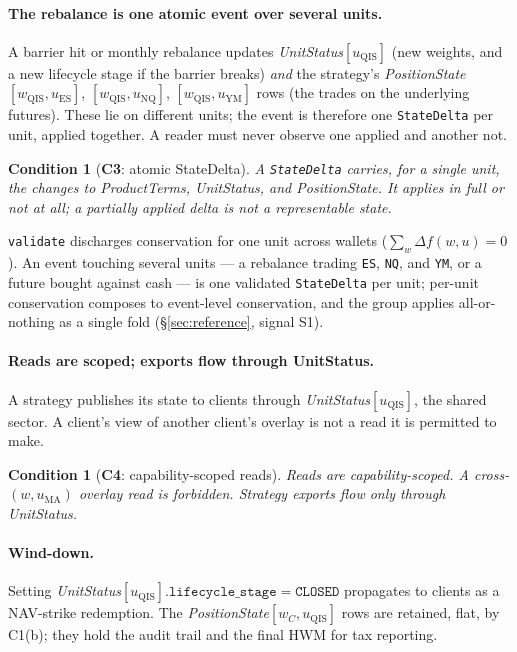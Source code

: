 \documentclass[11pt,a4paper]{article}
\newtheorem{condition}[definition]{Condition}
\begin{document}
\paragraph{The rebalance is one atomic event over several units.}
A barrier hit or monthly rebalance updates \emph{UnitStatus}$[u_{\mathrm{QIS}}]$ (new
weights, and a new lifecycle stage if the barrier breaks) \emph{and} the strategy's
\emph{PositionState}$[w_{\mathrm{QIS}},u_{\mathrm{ES}}]$,
$[w_{\mathrm{QIS}},u_{\mathrm{NQ}}]$, $[w_{\mathrm{QIS}},u_{\mathrm{YM}}]$ rows (the trades on
the underlying futures). These lie on different units; the event is therefore one
\texttt{StateDelta} per unit, applied together. A reader must never observe one applied and
another not.

\begin{condition}[\textbf{C3}: atomic StateDelta]
A \texttt{StateDelta} carries, for a single unit, the changes to \emph{ProductTerms},
\emph{UnitStatus}, and \emph{PositionState}. It applies in full or not at all; a partially
applied delta is not a representable state.
\end{condition}

\noindent \texttt{validate} discharges conservation for one unit across wallets
($\sum_{w}\Delta f(w,u)=0$). An event touching several units --- a rebalance trading
\texttt{ES}, \texttt{NQ}, and \texttt{YM}, or a future bought against cash --- is one
validated \texttt{StateDelta} per unit; per-unit conservation composes to event-level
conservation, and the group applies all-or-nothing as a single fold
(\S\ref{sec:reference}, signal S1).

\paragraph{Reads are scoped; exports flow through UnitStatus.}
A strategy publishes its state to clients through \emph{UnitStatus}$[u_{\mathrm{QIS}}]$, the
shared sector. A client's view of another client's overlay is not a read it is permitted to
make.

\begin{condition}[\textbf{C4}: capability-scoped reads]
Reads are capability-scoped. A cross-$(w,u_{\mathrm{MA}})$ overlay read is forbidden.
Strategy exports flow only through \emph{UnitStatus}.
\end{condition}

\paragraph{Wind-down.}
Setting \emph{UnitStatus}$[u_{\mathrm{QIS}}].\texttt{lifecycle\_stage}=\texttt{CLOSED}$
propagates to clients as a NAV-strike redemption. The
\emph{PositionState}$[w_C,u_{\mathrm{QIS}}]$ rows are retained, flat, by C1(b); they hold the
audit trail and the final HWM for tax reporting.
\end{document}
